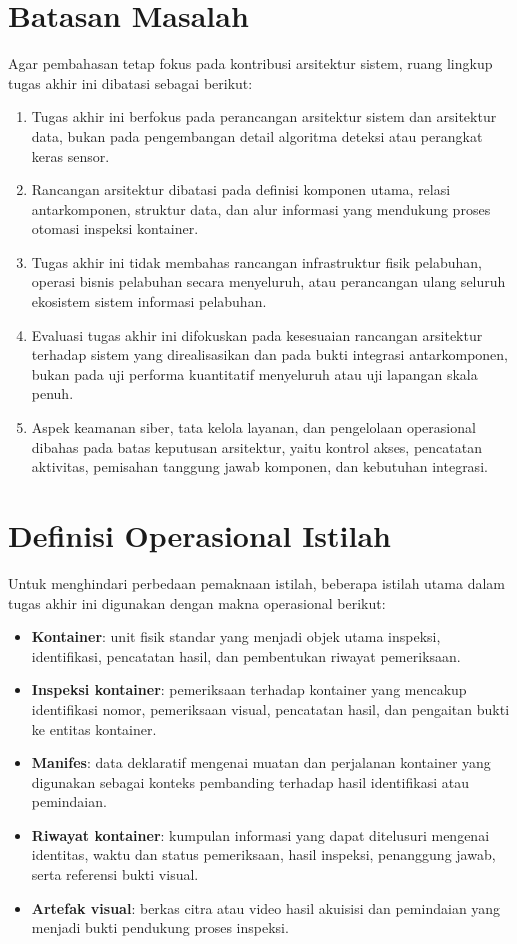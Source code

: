 \section{Batasan Masalah}

Agar pembahasan tetap fokus pada kontribusi arsitektur sistem, ruang lingkup
tugas akhir ini dibatasi sebagai berikut:
\begin{enumerate}
  \item Tugas akhir ini berfokus pada perancangan arsitektur sistem dan
  arsitektur data, bukan pada pengembangan detail algoritma deteksi atau
  perangkat keras sensor.
  \item Rancangan arsitektur dibatasi pada definisi komponen utama, relasi
  antarkomponen, struktur data, dan alur informasi yang mendukung proses
  otomasi inspeksi kontainer.
  \item Tugas akhir ini tidak membahas rancangan infrastruktur fisik pelabuhan,
  operasi bisnis pelabuhan secara menyeluruh, atau perancangan ulang seluruh
  ekosistem sistem informasi pelabuhan.
  \item Evaluasi tugas akhir ini difokuskan pada kesesuaian rancangan arsitektur
  terhadap sistem yang direalisasikan dan pada bukti integrasi antarkomponen,
  bukan pada uji performa kuantitatif menyeluruh atau uji
  lapangan skala penuh.
  \item Aspek keamanan siber, tata kelola layanan, dan pengelolaan operasional
  dibahas pada batas keputusan arsitektur, yaitu kontrol akses, pencatatan
  aktivitas, pemisahan tanggung jawab komponen, dan kebutuhan integrasi.
\end{enumerate}

\section{Definisi Operasional Istilah}

Untuk menghindari perbedaan pemaknaan istilah, beberapa istilah utama dalam
tugas akhir ini digunakan dengan makna operasional berikut:
\begin{itemize}[leftmargin=1.2cm,itemsep=0.15em,topsep=0.2em]
  \item \textbf{Kontainer}: unit fisik standar yang menjadi objek utama inspeksi, identifikasi, pencatatan hasil, dan pembentukan riwayat pemeriksaan.
  \item \textbf{Inspeksi kontainer}: pemeriksaan terhadap kontainer yang mencakup identifikasi nomor, pemeriksaan visual, pencatatan hasil, dan pengaitan bukti ke entitas kontainer.
  \item \textbf{Manifes}: data deklaratif mengenai muatan dan perjalanan kontainer yang digunakan sebagai konteks pembanding terhadap hasil identifikasi atau pemindaian.
  \item \textbf{Riwayat kontainer}: kumpulan informasi yang dapat ditelusuri mengenai identitas, waktu dan status pemeriksaan, hasil inspeksi, penanggung jawab, serta referensi bukti visual.
  \item \textbf{Artefak visual}: berkas citra atau video hasil akuisisi dan pemindaian yang menjadi bukti pendukung proses inspeksi.
\end{itemize}

